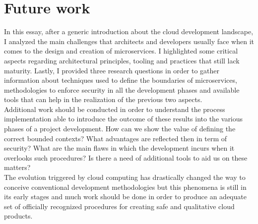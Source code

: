 \documentclass[a4paper, 10pt, conference]{ieeeconf}
\begin{document}
\section{Future work}

In this essay, after a generic introduction about the cloud development landscape, I analyzed the main challenges that architects and developers usually face when it comes to the design and creation of microservices. I highlighted some critical aspects regarding architectural principles, tooling and practices that still lack maturity. Lastly, I provided three research questions in order to gather information about techniques used to define the boundaries of microservices, methodologies to enforce security in all the development phases and available tools that can help in the realization of the previous two aspects.\\
Additional work should be conducted in order to understand the process implementation able to introduce the outcome of these results into the various phases of a project development. How can we show the value of defining the correct bounded contexts? What advantages are reflected then in term of security? What are the main flaws in which the development incurs when it overlooks such procedures? Is there a need of additional tools to aid us on these matters?\\
The evolution triggered by cloud computing has drastically changed the way to conceive conventional development methodologies but this phenomena is still in its early stages and much work should be done in order to produce an adequate set of officially recognized procedures for creating safe and qualitative cloud products.



\end{document}
